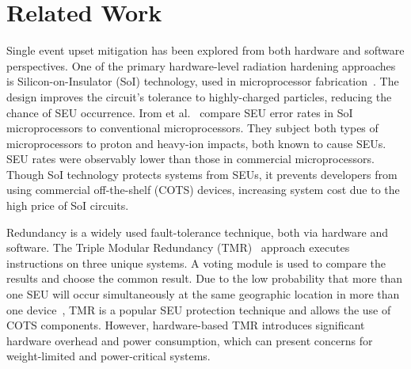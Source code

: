 \section{Related Work}\label{sec:related_work}
Single event upset mitigation has been explored from both hardware and software perspectives. 
One of the primary hardware-level radiation hardening approaches is Silicon-on-Insulator (SoI) technology, used in microprocessor fabrication~\cite{Celler2003SOI}. 
The design improves the circuit's tolerance to highly-charged particles, reducing the chance of SEU occurrence. 
Irom et al.~\cite{Irom2002SOI} compare SEU error rates in  SoI microprocessors to conventional microprocessors. They subject both types of microprocessors to proton and heavy-ion impacts, both known to cause SEUs. SEU rates were observably lower than those in commercial microprocessors. Though SoI technology protects systems from SEUs, it prevents developers from using commercial off-the-shelf (COTS) devices, increasing system cost due to the high price of SoI circuits.

Redundancy is a widely used fault-tolerance technique, both via hardware and software. The Triple Modular Redundancy (TMR)~\cite{TMR} approach executes instructions on three unique systems. A voting module is used to compare the results and choose the common result. Due to the low probability that more than one SEU will occur simultaneously at the same geographic location in more than one device~\cite{underwood1992observations}, TMR is a popular SEU protection technique and allows the use of COTS components. However, hardware-based TMR introduces significant hardware overhead and power consumption, which can present concerns for weight-limited and power-critical systems.

